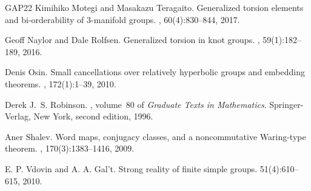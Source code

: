 \documentclass[12pt,leqno]{amsart}
\theoremstyle{definition}
\begin{document}
\begin{thebibliography}{GAP22}
Kimihiko Motegi and Masakazu Teragaito.
\newblock Generalized torsion elements and bi-orderability of 3-manifold
  groups.
, 60(4):830--844, 2017.

Geoff Naylor and Dale Rolfsen.
\newblock Generalized torsion in knot groups.
, 59(1):182--189, 2016.

Denis Osin.
\newblock Small cancellations over relatively hyperbolic groups and embedding
  theorems.
, 172(1):1--39, 2010.

Derek J.~S. Robinson.
, volume~80 of {\em Graduate
  Texts in Mathematics}.
\newblock Springer-Verlag, New York, second edition, 1996.

Aner Shalev.
\newblock Word maps, conjugacy classes, and a noncommutative {W}aring-type
  theorem.
, 170(3):1383--1416, 2009.

 E. P. Vdovin and A. A. Gal't. Strong reality of finite simple groups. 
 51(4):610--615, 2010.

\end{thebibliography}
\end{document}
